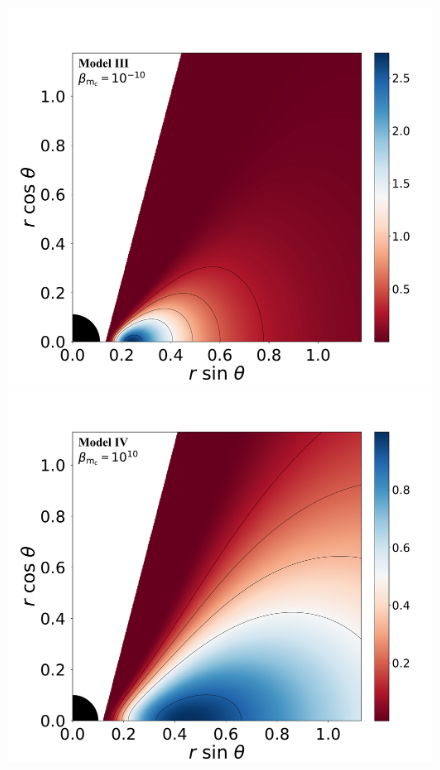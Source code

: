 \documentclass[twocolumn,aps,showpacs,showkeys,prd,superscriptaddress,byrevtex, amsmath]{revtex4-1}
\begin{document}
\begin{figure}
\includegraphics[scale=0.14]{figures/fig1_III__10.pdf}
\\
\includegraphics[scale=0.14]{figures/fig1_IV_10.pdf}
\hspace{-0.3cm}

\end{figure}
\end{document}
